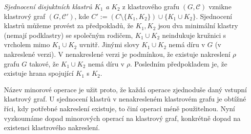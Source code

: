 \begin{defn}
\textit{Sjednocení disjuktních klastrů $K_1$ a $K_2$} z klastrového grafu $(G, \mathcal C)$ vznikne klastrový graf  $(G, \mathcal C')$, kde $C'  := (C\setminus \{K_1,K_2\}) \cup \{K_1 \cup K_2\}$. Sjednocení klastrů můžeme provést za předpokladů, že $K_1, K_2$ jsou dva minimální klastry (nemají podklastry) se společným rodičem, $K_1 \cup K_2$ neindukuje kružnici s vrcholem mimo $K_1 \cup K_2$ uvnitř. Jinými slovy $K_1 \cup K_2$ nemá díru v $G$ (v nakreslené verzi). V nenakreslené verzi je podmínkou, že existuje nakreslení $\rho$ grafu $G$ takové, že $K_1 \cup K_2$ nemá díru v $\rho$. Posledním předpokladem je, že existuje hrana spojující $K_1$ s $K_2$.
\end{defn}

Název minorové operace je užit proto, že každá operace zjednoduše daný vstupní klastrový graf. U sjednocení klastrů v nenakresleném klastrovém grafu je obtížné říci, kdy potřebné nakreslení existuje, to činí operaci méně použitelnou.
Nyní vyzkoumáme dopad minorových operací na klastrový graf, konkrétně dopad na existenci klastrového nakreslení.

